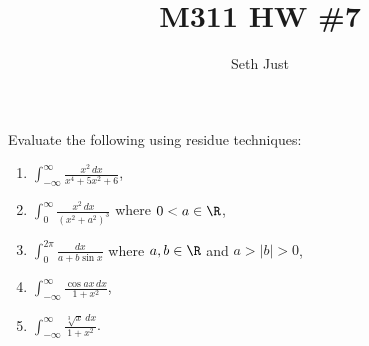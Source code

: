 

\author{Seth Just}
\title{M311 HW \#7}


  \maketitle

  \begin{prob}
    Evaluate the following using residue techniques:
    \begin{enumerate}
      \item $\int_{-\infty}^\infty \frac{x^2\,dx}{x^4+5x^2+6}$,\\
      \item $\int_0^\infty \frac{x^2\,dx}{(x^2+a^2)^3}$ where $0<a\in\R$,\\
      \item $\int_0^{2\pi} \frac{dx}{a+b\sin x}$ where $a,b\in\R$ and $a>|b|>0$,\\
      \item $\int_{-\infty}^\infty \frac{\cos ax\, dx}{1+x^2}$,\\
      \item $\int_{-\infty}^\infty \frac{\sqrt[3]{x}\,dx}{1+x^2}$.
    \end{enumerate}
  \end{prob}



